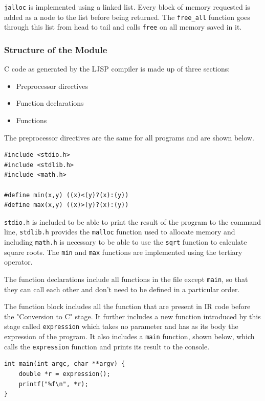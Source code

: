 \documentclass[11pt]{report}
\begin{document}
\texttt{jalloc} is implemented using a linked list. Every block of memory requested is added as a node to the list before being returned. The \texttt{free_all} function goes through this list from head to tail and calls \texttt{free} on all memory saved in it.

\subsubsection{Structure of the Module}
C code as generated by the LJSP compiler is made up of three sections:
\begin{itemize}
\item Preprocessor directives
\item Function declarations
\item Functions
\end{itemize}

The preprocessor directives are the same for all programs and are shown below.

\begin{lstlisting}
#include <stdio.h>
#include <stdlib.h>
#include <math.h>
    
#define min(x,y) ((x)<(y)?(x):(y))
#define max(x,y) ((x)>(y)?(x):(y))
\end{lstlisting}

\texttt{stdio.h} is included to be able to print the result of the program to the command line, \texttt{stdlib.h} provides the \texttt{malloc} function used to allocate memory and including \texttt{math.h} is necessary to be able to use the \texttt{sqrt} function to calculate square roots. The \texttt{min} and \texttt{max} functions are implemented using the tertiary operator.

The function declarations include all functions in the file except \texttt{main}, so that they can call each other and don't need to be defined in a particular order.

The function block includes all the function that are present in IR code before the "Conversion to C" stage. It further includes a new function introduced by this stage called \texttt{expression} which takes no parameter and has as its body the expression of the program. It also includes a \texttt{main} function, shown below, which calls the \texttt{expression} function and prints its result to the console.

\begin{lstlisting}
int main(int argc, char **argv) {
    double *r = expression();
    printf("%f\n", *r);
}
\end{lstlisting}
\end{document}
